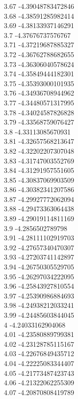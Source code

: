 {3.67	-4.39048783472846\\
3.68	-4.38591285982414\\
3.69	-4.38133937146291\\
3.7	-4.37676737576767\\
3.71	-4.37219687885327\\
3.72	-4.36762788682655\\
3.73	-4.36306040578624\\
3.74	-4.35849444182301\\
3.75	-4.35393000101935\\
3.76	-4.34936708944962\\
3.77	-4.34480571317995\\
3.78	-4.34024587826828\\
3.79	-4.33568759076427\\
3.8	-4.33113085670931\\
3.81	-4.32657568213647\\
3.82	-4.32202207307048\\
3.83	-4.31747003552769\\
3.84	-4.31291957551605\\
3.85	-4.30837069903509\\
3.86	-4.30382341207586\\
3.87	-4.29927772062094\\
3.88	-4.29473363064438\\
3.89	-4.29019114811169\\
3.9	-4.2856502789798\\
3.91	-4.28111102919703\\
3.92	-4.27657340470307\\
3.93	-4.27203741142897\\
3.94	-4.26750305529705\\
3.95	-4.26297034222095\\
3.96	-4.25843927810554\\
3.97	-4.25390986884693\\
3.98	-4.24938212033241\\
3.99	-4.24485603844045\\
4	-4.24033162904068\\
4.01	-4.23580889799381\\
4.02	-4.23128785115167\\
4.03	-4.22676849435712\\
4.04	-4.22225083344407\\
4.05	-4.21773487423743\\
4.06	-4.21322062255309\\
4.07	-4.20870808419789\\
}
